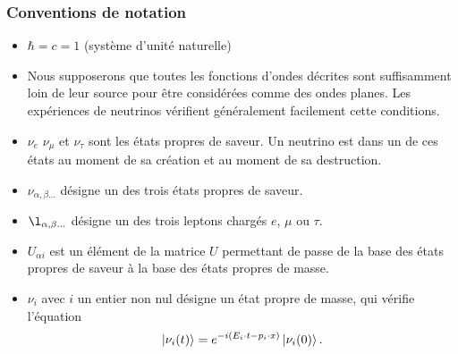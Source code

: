             \subsubsection{Conventions de notation}
            \begin{itemize}
                \item $\hbar = c = 1$ (système d'unité naturelle)
                \item Nous supposerons que toutes les fonctions d'ondes décrites sont suffisamment loin de leur source pour être considérées comme des ondes planes. Les expériences de neutrinos vérifient généralement facilement cette conditions.
                \item $\nu_e$ $\nu_{\mu}$ et $\nu_{\tau}$ sont les états propres de saveur. Un neutrino est dans un de ces états au moment de sa création et au moment de sa destruction.
                \item $\nu_{\alpha,\beta...}$ désigne un des trois états propres de saveur.
                \item $\l_{\alpha,\beta...}$ désigne un des trois leptons chargés $e$, $\mu$ ou $\tau$.
                \item $U_{\alpha i}$ est un élément de la matrice $U$ permettant de passe de la base des états propres de saveur à la base des états propres de masse.
                \item $\nu_{i}$ avec $i$ un entier non nul désigne un état propre de masse, qui vérifie l'équation
                \begin{equation}
                    \ket{\nu_i(t)} = e^{-i(E_i\cdot t - p_i\cdot x)}\ket{\nu_i(0)}.
                \end{equation}
            \end{itemize}
            
